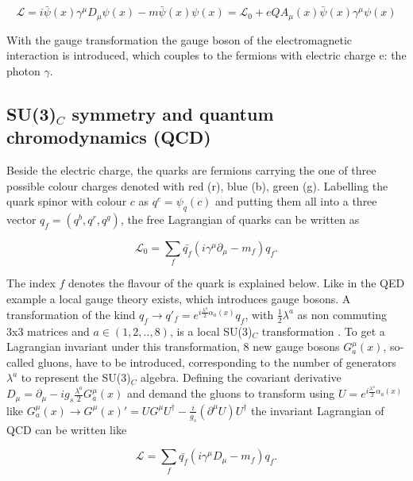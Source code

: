 \begin{equation}
	\label{eq:eq_1_2}
	\mathcal{L} = i\bar{\psi}(x)\gamma^{\mu}D_{\mu}\psi(x) - m\bar{\psi}(x)\psi(x) = \mathcal{L}_{0} + eQA_{\mu}(x)\bar{\psi}(x)\gamma^{\mu}\psi(x)
\end{equation}

With the gauge transformation the gauge boson of the electromagnetic interaction is introduced, which couples to the fermions with electric charge e: the photon $\gamma$.


\subsection{SU(3)${_C}$ symmetry and quantum chromodynamics (\gls{QCD})}
\label{sec:section_1_1_2}

Beside the electric charge, the quarks are fermions carrying the one of three possible colour charges denoted with red (r), blue (b), green (g). Labelling the quark spinor with colour $c$ as $q^{c} = \psi_{q}(c)$ and putting them all into a three vector $q_{f} = (q^{b}, q^{r}, q^{g})$, the free Lagrangian of quarks can be written as

\begin{equation}
	\label{eq:eq_1_3}
	\mathcal{L}_{0} = \sum_{f} \bar{q_{f}}(i\gamma^{\mu}\partial_{\mu} - m_{f})q_{f}.
\end{equation}

The index $f$ denotes the flavour of the quark is explained below. Like in the \gls{QED} example a local gauge theory exists, which introduces gauge bosons. A transformation of the kind $q_{f} \rightarrow q'_{f} = e^{i\frac{\lambda^{a}}{2}\alpha_{a}(x)} q_{f}$, with $\frac{1}{2} \lambda^{a}$ as non commuting 3x3 matrices and $a \in (1, 2, .., 8)$, is a local SU(3)$_{C}$ transformation \cite{QCD}. To get a Lagrangian invariant under this transformation, 8 new gauge bosons $G^{\mu}_{a}(x)$, so-called gluons, have to be introduced, corresponding to the number of generators $\lambda^{a}$ to represent the SU(3)$_{C}$ algebra. Defining the covariant derivative $D_{\mu} = \partial_{\mu}-ig_{s}\frac{\lambda^{a}}{2}G^{\mu}_{a}(x)$ and demand the gluons to transform using $U = e^{i\frac{\lambda^{a}}{2}\alpha_{a}(x)}$ like $G^{\mu}_{a}(x) \rightarrow G^{\mu}(x)' = UG^{\mu}U^{\dagger} - \frac{i}{g_s}(\partial^{\mu}U)U^{\dagger}$ the invariant Lagrangian of \gls{QCD} can be written like 

\begin{equation}
	\label{eq:eq_1_4}
	\mathcal{L} = \sum_{f} \bar{q_{f}}(i\gamma^{\mu}D_{\mu} - m_{f})q_{f}.
\end{equation}

